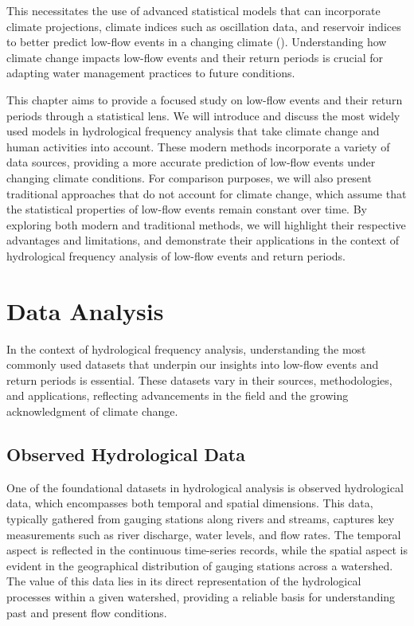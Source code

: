 \documentclass[
]{krantz}
\begin{document}
This necessitates the use of advanced statistical models that can incorporate climate projections, climate indices such as oscillation data, and reservoir indices to better predict low-flow events in a changing climate (\citet{Coles2001}). Understanding how climate change impacts low-flow events and their return periods is crucial for adapting water management practices to future conditions.

This chapter aims to provide a focused study on low-flow events and their return periods through a statistical lens. We will introduce and discuss the most widely used models in hydrological frequency analysis that take climate change and human activities into account. These modern methods incorporate a variety of data sources, providing a more accurate prediction of low-flow events under changing climate conditions. For comparison purposes, we will also present traditional approaches that do not account for climate change, which assume that the statistical properties of low-flow events remain constant over time. By exploring both modern and traditional methods, we will highlight their respective advantages and limitations, and demonstrate their applications in the context of hydrological frequency analysis of low-flow events and return periods.

\section{Data Analysis}\label{data-analysis}

In the context of hydrological frequency analysis, understanding the most commonly used datasets that underpin our insights into low-flow events and return periods is essential. These datasets vary in their sources, methodologies, and applications, reflecting advancements in the field and the growing acknowledgment of climate change.

\subsection{Observed Hydrological Data}\label{observed-hydrological-data}

One of the foundational datasets in hydrological analysis is observed hydrological data, which encompasses both temporal and spatial dimensions. This data, typically gathered from gauging stations along rivers and streams, captures key measurements such as river discharge, water levels, and flow rates. The temporal aspect is reflected in the continuous time-series records, while the spatial aspect is evident in the geographical distribution of gauging stations across a watershed. The value of this data lies in its direct representation of the hydrological processes within a given watershed, providing a reliable basis for understanding past and present flow conditions.
\end{document}
